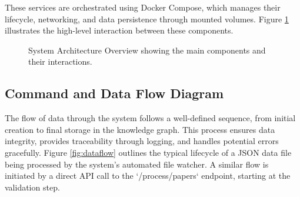 \documentclass[12pt,a4paper]{article}
\begin{document}
These services are orchestrated using Docker Compose, which manages their lifecycle, networking, and data persistence through mounted volumes. Figure \ref{fig:architecture} illustrates the high-level interaction between these components.

\begin{figure}[H]
    \centering
    \caption{System Architecture Overview showing the main components and their interactions.}
    \label{fig:architecture}
\end{figure}

\subsection{Command and Data Flow Diagram}
The flow of data through the system follows a well-defined sequence, from initial creation to final storage in the knowledge graph. This process ensures data integrity, provides traceability through logging, and handles potential errors gracefully. Figure \ref{fig:dataflow} outlines the typical lifecycle of a JSON data file being processed by the system's automated file watcher. A similar flow is initiated by a direct API call to the `/process/papers` endpoint, starting at the validation step.
\end{document}
